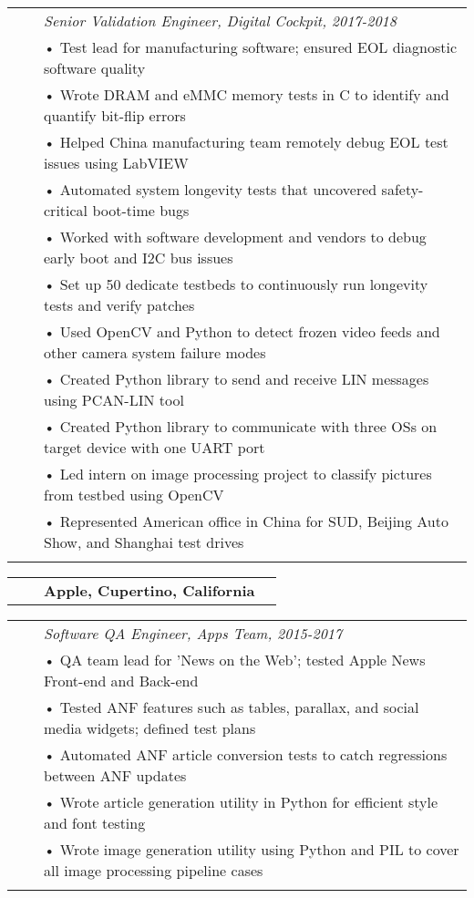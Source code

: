 \documentclass{minimal}
\begin{document}
\begin{CJK*}{UTF8}{}
\begin{tabular}{ p{1.5cm} p{1cm} p{16cm} }
& & \textit{Senior Validation Engineer, Digital Cockpit, 2017-2018}\\
& & • Test lead for manufacturing software; ensured EOL diagnostic software quality\\
& & • Wrote DRAM and eMMC memory tests in C to identify and quantify bit-flip errors\\
& & • Helped China manufacturing team remotely debug EOL test issues using LabVIEW\\
& & • Automated system longevity tests that uncovered safety-critical boot-time bugs\\
& & • Worked with software development and vendors to debug early boot and I2C bus issues\\
& & • Set up 50 dedicate testbeds to continuously run longevity tests and verify patches\\
& & • Used OpenCV and Python to detect frozen video feeds and other camera system failure modes\\
& & • Created Python library to send and receive LIN messages using PCAN-LIN tool\\
& & • Created Python library to communicate with three OSs on target device with one UART port\\
& & • Led intern on image processing project to classify pictures from testbed using OpenCV\\
& & • Represented American office in China for SUD, Beijing Auto Show, and Shanghai test drives\\
& & \\
\end{tabular}

\begin{tabular}{ p{1.5cm} p{1cm} p{10cm} >{\raggedleft\arraybackslash}p{3cm} }
& & \textbf{Apple, Cupertino, California} & \\
\end{tabular}

\begin{tabular}{ p{1.5cm} p{1cm} p{16cm} }
& & \textit{Software QA Engineer, Apps Team, 2015-2017}\\
& & • QA team lead for 'News on the Web'; tested Apple News Front-end and Back-end\\
& & • Tested ANF features such as tables, parallax, and social media widgets; defined test plans\\
& & • Automated ANF article conversion tests to catch regressions between ANF updates\\
& & • Wrote article generation utility in Python for efficient style and font testing\\
& & • Wrote image generation utility using Python and PIL to cover all image processing pipeline cases\\
& & \\
\end{tabular}


\end{CJK*}
\end{document}
